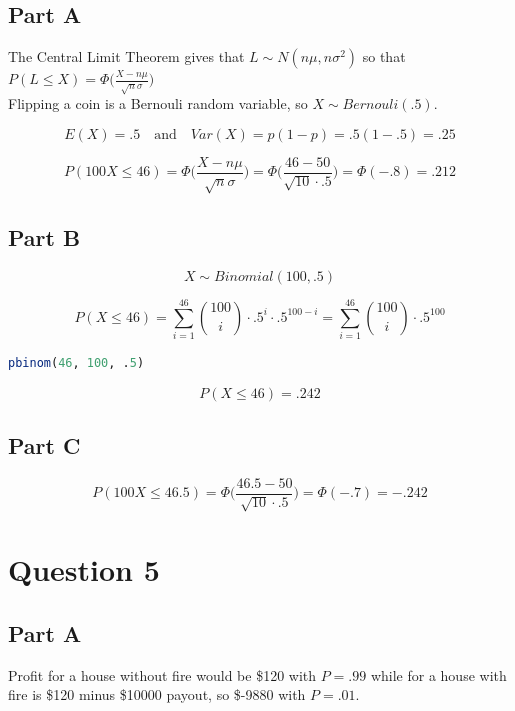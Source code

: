 \documentclass[letterpaper]{article}
\begin{document}
\subsection*{Part A}

The Central Limit Theorem gives that $L \sim N(n\mu, n\sigma^2)$ so that $P(L \leq X) = \Phi \Big( \frac{X - n\mu}{\sqrt{n}\sigma} \Big)$\\

\noindent Flipping a coin is a Bernouli random variable, so $X \sim Bernouli(.5)$.

$$E(X) = .5 \quad \text{and} \quad Var(X) = p(1-p) = .5(1 - .5) = .25$$

$$P(100X \leq 46) = \Phi \Big( \frac{X - n\mu}{\sqrt{n}\sigma} \Big) = \Phi \Big( \frac{46 - 50}{\sqrt{10} \cdot .5} \Big) = \Phi (-.8) = .212$$

\subsection*{Part B}

$$X \sim Binomial(100, .5)$$

$$P(X \leq 46) = \sum_{i=1}^{46} \binom{100}{i} \cdot .5^i \cdot .5^{100 - i} = \sum_{i=1}^{46} \binom{100}{i} \cdot .5^{100}$$

\begin{lstlisting}[language=R]
     pbinom(46, 100, .5)
\end{lstlisting}

$$P(X \leq 46) = .242$$

\subsection*{Part C}

$$P(100X \leq 46.5) = \Phi \Big( \frac{46.5 - 50}{\sqrt{10} \cdot .5} \Big) = \Phi (-.7) = -.242$$

\newpage

\section*{Question 5}

\subsection*{Part A}

Profit for a house without fire would be \$120 with $P = .99$ while for a house with fire is \$120 minus \$10000 payout, so \$-9880 with $P = .01$.
\end{document}
